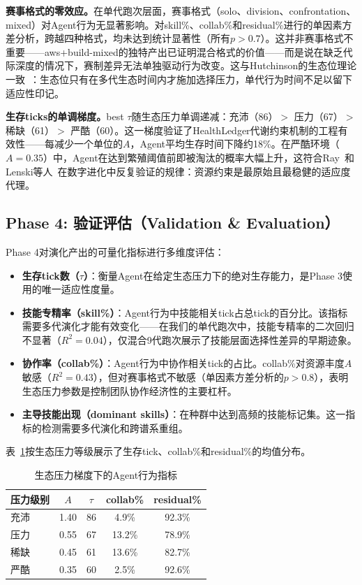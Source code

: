 \documentclass[conference]{IEEEtran}
\begin{document}
\textbf{赛事格式的零效应。}在单代跑次层面，赛事格式（solo、division、confrontation、mixed）对Agent行为无显著影响。对skill\%、collab\%和residual\%进行的单因素方差分析，跨越四种格式，均未达到统计显著性（所有$p>0.7$）。这并非赛事格式不重要——aws+build-mixed的独特产出已证明混合格式的价值——而是说在缺乏代际深度的情况下，赛制差异无法单独驱动行为改变。这与Hutchinson的生态位理论一致~\cite{hutchinson1957concluding}：生态位只有在多代生态时间内才施加选择压力，单代行为时间不足以留下适应性印记。

\textbf{生存ticks的单调梯度。}best $\tau$随生态压力单调递减：充沛（86）$>$ 压力（67）$>$ 稀缺（61）$>$ 严酷（60）。这一梯度验证了HealthLedger代谢约束机制的工程有效性——每减少一个单位的$A$，Agent平均生存时间下降约18\%。在严酷环境（$A=0.35$）中，Agent在达到繁殖阈值前即被淘汰的概率大幅上升，这符合Ray~\cite{ray1991tierra}和Lenski等人~\cite{lenski2003evolutionary}在数字进化中反复验证的规律：资源约束是最原始且最稳健的适应度代理。

\subsection{Phase 4: 验证评估（Validation \& Evaluation）}

Phase 4对演化产出的可量化指标进行多维度评估：

\begin{itemize}
\item \textbf{生存tick数（$\tau$）}：衡量Agent在给定生态压力下的绝对生存能力，是Phase 3使用的唯一适应性度量。
\item \textbf{技能专精率（skill\%）}：Agent行为中技能相关tick占总tick的百分比。该指标需要多代演化才能有效变化——在我们的单代跑次中，技能专精率的二次回归不显著（$R^2=0.04$），仅混合9代跑次展示了技能层面选择性差异的早期迹象。
\item \textbf{协作率（collab\%）}：Agent行为中协作相关tick的占比。collab\%对资源丰度$A$敏感（$R^2=0.43$），但对赛事格式不敏感（单因素方差分析的$p>0.8$），表明生态压力参数是控制团队协作经济性的主要杠杆。
\item \textbf{主导技能出现（dominant skills）}：在种群中达到高频的技能标记集。这一指标的检测需要多代演化和跨谱系重组。
\end{itemize}

表~\ref{tab:survival}按生态压力等级展示了生存tick、collab\%和residual\%的均值分布。

\begin{table}[t]
\centering
\caption{生态压力梯度下的Agent行为指标}
\label{tab:survival}
\renewcommand{\arraystretch}{1.1}
\begin{tabular}{lcccc}
\toprule
压力级别 & $A$ & $\tau$ & collab\% & residual\% \\
\midrule
充沛 & 1.40 & 86 & 4.9\% & 92.3\% \\
压力 & 0.55 & 67 & 13.2\% & 78.9\% \\
稀缺 & 0.45 & 61 & 13.6\% & 82.7\% \\
严酷 & 0.35 & 60 & 2.5\% & 92.6\% \\
\bottomrule
\end{tabular}
\end{table}
\end{document}
